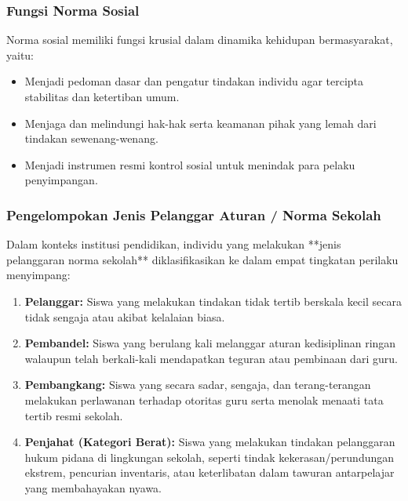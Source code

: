 \documentclass[12pt, a4paper]{article}
\begin{document}
\subsubsection{Fungsi Norma Sosial}
Norma sosial memiliki fungsi krusial dalam dinamika kehidupan bermasyarakat, yaitu:
\begin{itemize}
    \item Menjadi pedoman dasar dan pengatur tindakan individu agar tercipta stabilitas dan ketertiban umum.
    \item Menjaga dan melindungi hak-hak serta keamanan pihak yang lemah dari tindakan sewenang-wenang.
    \item Menjadi instrumen resmi kontrol sosial untuk menindak para pelaku penyimpangan.
\end{itemize}

\subsubsection{Pengelompokan Jenis Pelanggar Aturan / Norma Sekolah}
Dalam konteks institusi pendidikan, individu yang melakukan **jenis pelanggaran norma sekolah** diklasifikasikan ke dalam empat tingkatan perilaku menyimpang:
\begin{enumerate}
    \item \textbf{Pelanggar:} Siswa yang melakukan tindakan tidak tertib berskala kecil secara tidak sengaja atau akibat kelalaian biasa.
    \item \textbf{Pembandel:} Siswa yang berulang kali melanggar aturan kedisiplinan ringan walaupun telah berkali-kali mendapatkan teguran atau pembinaan dari guru.
    \item \textbf{Pembangkang:} Siswa yang secara sadar, sengaja, dan terang-terangan melakukan perlawanan terhadap otoritas guru serta menolak menaati tata tertib resmi sekolah.
    \item \textbf{Penjahat (Kategori Berat):} Siswa yang melakukan tindakan pelanggaran hukum pidana di lingkungan sekolah, seperti tindak kekerasan/perundungan ekstrem, pencurian inventaris, atau keterlibatan dalam tawuran antarpelajar yang membahayakan nyawa.
\end{enumerate}
\end{document}
